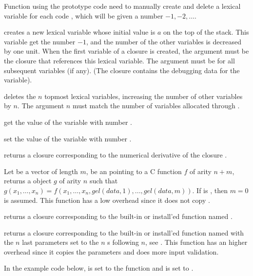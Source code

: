 \label{se:pushlex}

Function using the prototype code  need to manually create and delete a
lexical variable for each code , which will be given a number $-1, -2,
\ldots$.

 creates a new lexical variable whose
initial value is $a$ on the top of the stack. This variable get the number
$-1$, and the number of the other variables is decreased by one unit. When
the first variable of a closure is created, the argument  must be the
closure that references this lexical variable. The argument  must be
 for all subsequent variables (if any).  (The closure contains the
debugging data for the variable).

 deletes the $n$ topmost lexical variables,
increasing the number of other variables by $n$. The argument $n$ must
match the number of variables allocated through .

 get the value of the variable with number .

 set the value of the variable with number
.


 returns a closure corresponding to the
numerical derivative of the closure .

Let  be a vector of length $m$,  be an  pointing
to a C function $f$ of arity $n+m$, returns a  object $g$ of arity
$n$ such that $g(x_1,\ldots,x_n)=f(x_1,\ldots,x_n,gel(data,1),...,gel(data,m))$.
If  is , then $m=0$ is assumed.  This function has a low
overhead since it does not copy .

 returns a closure corresponding to the
built-in or install'ed function named .

 returns a closure corresponding to the
built-in or install'ed function named  with the $n$ last parameters set to
the $n$ s following $n$, see . This function
has an higher overhead since it copies the parameters and does more input validation.

In the example code below,  is set to the function  and
 is set to .

